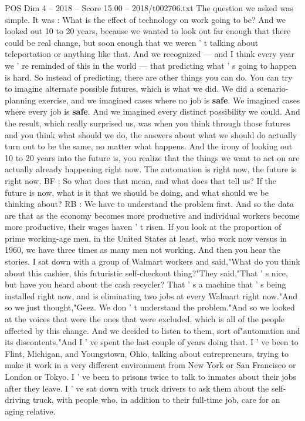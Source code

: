 \begin{textsample}{POS Dim 4 – 2018 – Score 15.00 – 2018/t002706.txt}
The question we asked was simple.
It was : What is the effect of technology on work going to be?
And we looked out 10 to 20 years, because we wanted to look out far enough that there could be real change, but soon enough that we weren ' t talking about teleportation or anything like that.
And we recognized — and I think every year we ' re reminded of this in the world — that predicting what ' s going to happen is hard.
So instead of predicting, there are other things you can do.
You can try to imagine alternate possible futures, which is what we did.
We did a scenario-planning exercise, and we imagined cases where no job is \textbf{safe}.
We imagined cases where every job is \textbf{safe}.
And we imagined every distinct possibility we could.
And the result, which really surprised us, was when you think through those futures and you think what should we do, the answers about what we should do actually turn out to be the same, no matter what happens.
And the irony of looking out 10 to 20 years into the future is, you realize that the things we want to act on are actually already happening right now.
The automation is right now, the future is right now.
BF : So what does that mean, and what does that tell us?
If the future is now, what is it that we should be doing, and what should we be thinking about?
RB : We have to understand the problem first.
And so the data are that as the economy becomes more productive and individual workers become more productive, their wages haven ' t risen.
If you look at the proportion of prime working-age men, in the United States at least, who work now versus in 1960, we have three times as many men not working.
And then you hear the stories.
I sat down with a group of Walmart workers and said,"What do you think about this cashier, this futuristic self-checkout thing?"They said,"That ' s nice, but have you heard about the cash recycler?
That ' s a machine that ' s being installed right now, and is eliminating two jobs at every Walmart right now."And so we just thought,"Geez.
We don ' t understand the problem."And so we looked at the voices that were the ones that were excluded, which is all of the people affected by this change.
And we decided to listen to them, sort of"automation and its discontents."And I ' ve spent the last couple of years doing that.
I ' ve been to Flint, Michigan, and Youngstown, Ohio, talking about entrepreneurs, trying to make it work in a very different environment from New York or San Francisco or London or Tokyo.
I ' ve been to prisons twice to talk to inmates about their jobs after they leave.
I ' ve sat down with truck drivers to ask them about the self-driving truck, with people who, in addition to their full-time job, care for an aging relative.

\end{textsample}
